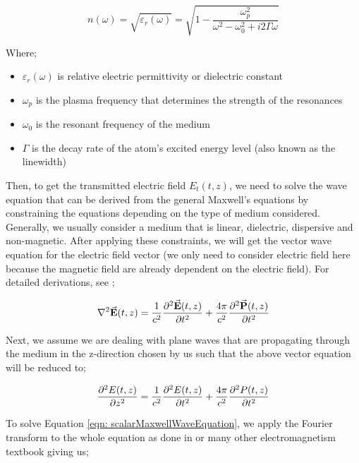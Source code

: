 \begin{equation}
    n(\omega) = \sqrt{\varepsilon_{r}(\omega)} = \sqrt{1 - \frac{\omega_{p}^{2}}{\omega^{2} - \omega_{0}^{2} + i2\Gamma\omega}}
    \label{eqn: nw}
\end{equation}

\newpage

Where;

\begin{itemize}
    \item $\varepsilon_{r}(\omega)$ is relative electric permittivity or dielectric constant
    \item $\omega_{p}$ is the plasma frequency that determines the strength of the resonances
    \item $\omega_{0}$ is the resonant frequency of the medium
    \item $\Gamma$ is the decay rate of the atom's excited energy level (also known as the linewidth)
\end{itemize}

Then, to get the transmitted electric field $E_{t}(t, z)$, we need to solve the wave equation that can be derived from the general Maxwell's equations by constraining the equations depending on the type of medium considered. Generally, we usually consider a medium that is linear, dielectric, dispersive and non-magnetic. After applying these constraints, we will get the vector wave equation for the electric field vector (we only need to consider electric field here because the magnetic field are already dependent on the electric field). For detailed derivations, see ;

\begin{equation}
    \laplacian{\va{E}(t, z)} = \frac{1}{c^2} \pdv[2]{\va{E}(t, z)}{t} + \frac{4\pi}{c^2} \pdv[2]{\va{P}(t, z)}{t}
\end{equation}

Next, we assume we are dealing with plane waves that are propagating through the medium in the z-direction chosen by us such that the above vector equation will be reduced to;

\begin{equation}
    \pdv[2]{E(t, z)}{z} = \frac{1}{c^2} \pdv[2]{E(t, z)}{t} + \frac{4\pi}{c^2} \pdv[2]{P(t, z)}{t}
    \label{eqn: scalarMaxwellWaveEquation}
\end{equation}

To solve Equation \ref{eqn: scalarMaxwellWaveEquation}, we apply the Fourier transform to the whole equation as done in \cite{jackson1999classical} or many other electromagnetism textbook giving us;

